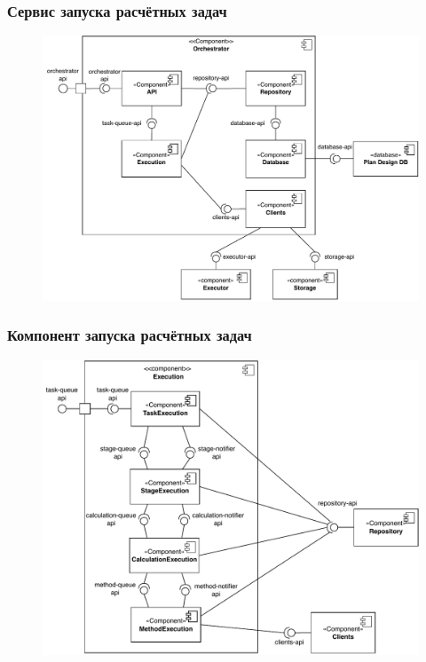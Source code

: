 \begin{frame}
\frametitle{Сервис запуска расчётных задач}
\begin{figure}
    \includegraphics[scale=.5]{pictures/architecture/orchestrator_component_common}
\end{figure}
\end{frame}


\begin{frame}
\frametitle{Компонент запуска расчётных задач}
\begin{figure}
    \includegraphics[scale=.5]{pictures/architecture/orchestrator_component_detailed}
\end{figure}
\end{frame}


